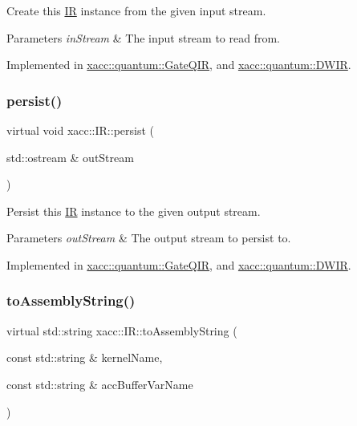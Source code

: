 Create this \hyperlink{a01175}{IR} instance from the given input stream.


\begin{DoxyParams}{Parameters}
{\em in\+Stream} & The input stream to read from. \\
\hline
\end{DoxyParams}


Implemented in \hyperlink{a01027_a07f26eeb362ac480d20da6cdc8c8fb39}{xacc\+::quantum\+::\+Gate\+Q\+IR}, and \hyperlink{a00979_a8b388d719d565bb902c979807d3d0d47}{xacc\+::quantum\+::\+D\+W\+IR}.

\mbox{\label{a01175_a414b72224d88473ad6190bb88102a3ea}} 
\subsubsection{\texorpdfstring{persist()}{persist()}}
{\footnotesize\ttfamily virtual void xacc\+::\+I\+R\+::persist (\begin{DoxyParamCaption}\item[{std\+::ostream \&}]{out\+Stream }\end{DoxyParamCaption})\hspace{0.3cm}{\ttfamily [pure virtual]}}

Persist this \hyperlink{a01175}{IR} instance to the given output stream.


\begin{DoxyParams}{Parameters}
{\em out\+Stream} & The output stream to persist to. \\
\hline
\end{DoxyParams}


Implemented in \hyperlink{a01027_a40e1d07e4dfd3794ef53fca3cdbdca61}{xacc\+::quantum\+::\+Gate\+Q\+IR}, and \hyperlink{a00979_abcbfd0a4cf697843391c65cbd9a82080}{xacc\+::quantum\+::\+D\+W\+IR}.

\mbox{\label{a01175_a8356cdff1919b88eabeb84fd7450cdb6}} 
\subsubsection{\texorpdfstring{to\+Assembly\+String()}{toAssemblyString()}}
{\footnotesize\ttfamily virtual std\+::string xacc\+::\+I\+R\+::to\+Assembly\+String (\begin{DoxyParamCaption}\item[{const std\+::string \&}]{kernel\+Name,  }\item[{const std\+::string \&}]{acc\+Buffer\+Var\+Name }\end{DoxyParamCaption})\hspace{0.3cm}{\ttfamily [pure virtual]}}

